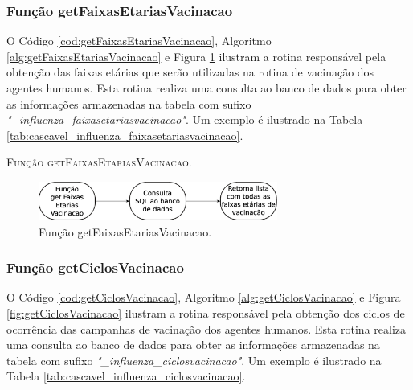 \newpage

\subsubsection{Função getFaixasEtariasVacinacao}

O Código \ref{cod:getFaixasEtariasVacinacao}, Algoritmo \ref{alg:getFaixasEtariasVacinacao} e Figura \ref{fig:getFaixasEtariasVacinacao} ilustram a rotina responsável pela obtenção das faixas etárias que serão utilizadas na rotina de vacinação dos agentes humanos. Esta rotina realiza uma consulta ao banco de dados para obter as informações armazenadas na tabela com sufixo \textit{"\_influenza\_faixasetariasvacinacao"}. Um exemplo é ilustrado na Tabela \ref{tab:cascavel_influenza_faixasetariasvacinacao}.



\begin{algorithm}[H]
   \SetAlgoLined   
   
   \caption{\textsc{Função getFaixasEtariasVacinacao.}}
   \label{alg:getFaixasEtariasVacinacao}
\end{algorithm}

\begin{figure}[H]
  \centering
  \includegraphics[width=0.7\textwidth]{Figuras/Simula/Fluxos/getFaixasEtariasVacinacao.eps}
  \caption{Função getFaixasEtariasVacinacao.}
  \label{fig:getFaixasEtariasVacinacao}
\end{figure} 

\newpage

\subsubsection{Função getCiclosVacinacao}

O Código \ref{cod:getCiclosVacinacao}, Algoritmo \ref{alg:getCiclosVacinacao} e Figura \ref{fig:getCiclosVacinacao} ilustram a rotina responsável pela obtenção dos ciclos de ocorrência das campanhas de vacinação dos agentes humanos. Esta rotina realiza uma consulta ao banco de dados para obter as informações armazenadas na tabela com sufixo \textit{"\_influenza\_ciclosvacinacao"}. Um exemplo é ilustrado na Tabela \ref{tab:cascavel_influenza_ciclosvacinacao}.

